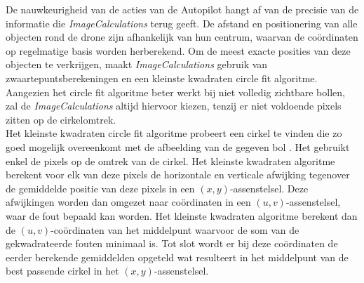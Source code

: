 \noindent
De nauwkeurigheid van de acties van de Autopilot hangt af van de precisie van de informatie die \textit{ImageCalculations} terug geeft. De afstand en positionering van alle objecten rond de drone zijn afhankelijk van hun centrum, waarvan de co\"ordinaten op regelmatige basis worden herberekend. Om de meest exacte posities van deze objecten te verkrijgen, maakt \textit{ImageCalculations} gebruik van zwaartepuntsberekeningen en een kleinste kwadraten circle fit algoritme. Aangezien het circle fit algoritme beter werkt bij niet volledig zichtbare bollen, zal de \textit{ImageCalculations} altijd hiervoor kiezen, tenzij er niet voldoende pixels zitten op de cirkelomtrek.
\\
Het kleinste kwadraten circle fit algoritme probeert een cirkel te vinden die zo goed mogelijk overeenkomt met de afbeelding van de gegeven bol \cite{website:kleinsteKwadraten}. Het gebruikt enkel de pixels op de omtrek van de cirkel. Het kleinste kwadraten algoritme berekent voor elk van deze pixels de horizontale en verticale afwijking tegenover de gemiddelde positie van deze pixels in een \((x,y)\)-assenstelsel. Deze afwijkingen worden dan omgezet naar co\"ordinaten in een \((u,v)\)-assenstelsel, waar de fout bepaald kan worden. Het kleinste kwadraten algoritme berekent dan de \((u,v)\)-co\"ordinaten van het middelpunt waarvoor de som van de gekwadrateerde fouten minimaal is. Tot slot wordt er bij deze co\"ordinaten de eerder berekende gemiddelden opgeteld wat resulteert in het middelpunt van de best passende cirkel in het \((x,y)\)-assenstelsel.
